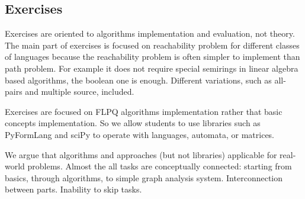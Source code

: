 \documentclass[sigconf]{acmart}
\begin{document}
\subsection{Exercises}

Exercises are oriented to algorithms implementation and evaluation, not theory. 
The main part of exercises is focused on reachability problem for different classes of languages because the reachability problem is often simpler to implement than path problem.
For example it does not require special semirings in linear algebra based algorithms, the boolean one is enough.  
Different variations, such as all-pairs and multiple source, included.

Exercises are focused on FLPQ algorithms implementation rather that basic concepts implementation.
So we allow students to use libraries such as PyFormLang and sciPy to operate with languages, automata, or matrices.

We argue that algorithms and approaches (but not libraries) applicable for real-world problems. 
Almost the all tasks are conceptually connected: starting from basics, through algorithms, to simple graph analysis system.
Interconnection between parts. 
Inability to skip tasks. 
\end{document}
